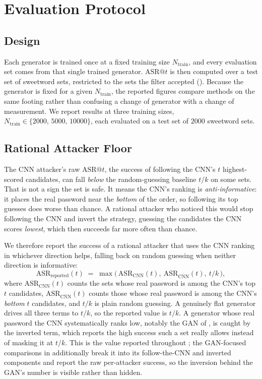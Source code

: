 \section{Evaluation Protocol}
\label{sec:method-coinflip}

\subsection{Design}

Each generator is trained once at a fixed training size
$N_{\text{train}}$, and every evaluation set comes from that single
trained generator. $\mathrm{ASR}@t$ is then computed over a test set of
sweetword sets, restricted to the sets the filter accepted
(). Because the generator is fixed for a given
$N_{\text{train}}$, the reported figures compare methods on the same
footing rather than confusing a change of generator with a change of
measurement. We report results at three training sizes,
$N_{\text{train}} \in \{2000,\,5000,\,10000\}$, each evaluated on a test
set of $2000$ sweetword sets.

\subsection{Rational Attacker Floor}

The CNN attacker's raw $\mathrm{ASR}@t$, the success of following the
CNN's $t$ highest-scored candidates, can fall \emph{below} the
random-guessing baseline $t/k$ on some sets. That is not a sign the set
is safe. It means the CNN's ranking is \emph{anti-informative}: it
places the real password near the \emph{bottom} of the order, so
following its top guesses does worse than chance. A rational attacker
who noticed this would stop following the CNN and invert the strategy,
guessing the candidates the CNN scores \emph{lowest}, which then
succeeds far more often than chance.

We therefore report the success of a rational attacker that uses the CNN
ranking in whichever direction helps, falling back on random guessing
when neither direction is informative:
%
\begin{equation}
\mathrm{ASR}_{\text{reported}}(t)
    \;=\; \max\!\bigl(\, \mathrm{ASR}_{\text{CNN}}(t),\
    \mathrm{ASR}_{\overline{\text{CNN}}}(t),\ t/k \,\bigr),
\label{eq:rational}
\end{equation}
%
where $\mathrm{ASR}_{\text{CNN}}(t)$ counts the sets whose real password
is among the CNN's top $t$ candidates,
$\mathrm{ASR}_{\overline{\text{CNN}}}(t)$ counts those whose real
password is among the CNN's \emph{bottom} $t$ candidates, and $t/k$ is
plain random guessing. A genuinely flat generator drives all three terms
to $t/k$, so the reported value is $t/k$. A generator whose real
password the CNN systematically ranks low, notably the GAN of
, is caught by the inverted term, which reports
the high success such a set really allows instead of masking it at
$t/k$. This is the value reported throughout \Cref{ch:results}; the
GAN-focused comparisons in \Cref{sec:results-gan} additionally break it
into its follow-the-CNN and inverted components and report the raw
per-attacker success, so the inversion behind the GAN's number is
visible rather than hidden.

